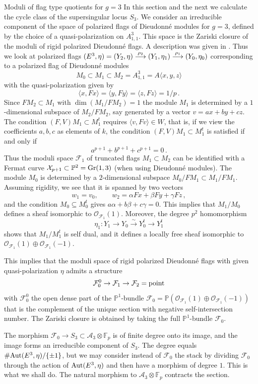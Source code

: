 \documentclass[11pt]{amsart}
\numberwithin{equation}{section}
\newcommand{\FF}{\mathbb F}
\newcommand{\PP}{\mathbb P}
\newcommand\langepijl[1]{\buildrel {#1} \over \longrightarrow}
\theoremstyle{definition}
\theoremstyle{remark}
\begin{document}
\begin{section}{Moduli of flag type quotients for $g=3$}
In this section and the next we calculate the cycle class of the supersingular locus $S_3$.
We consider an irreducible component of 
the space of polarized flags of Dieudonn\'e
modules for $g=3$, defined by the choice of a quasi-polarization on
$A_{1,1}^3$. This space is the Zariski closure 
of the moduli of rigid polarized Dieudonn\'e flags.
A description
was given in \cite[p.\ 58]{L-O}. Thus we look at polarized flags
$(E^3,\eta)=(Y_2,\eta) \langepijl{\rho_2} (Y_1,\eta_1)
\langepijl{\rho_1} (Y_0,\eta_0)$ corresponding to a polarized flag
of Dieudonn\'e modules
$$
M_0 \subset M_1 \subset M_2=A_{1,1}^3=A\langle x,y,z\rangle
$$
with the quasi-polarization given by 
$$
\langle x,Fx\rangle= \langle y,Fy\rangle=\langle z,Fz\rangle=1/p
\, .
$$
Since $FM_2 \subset M_1$ with $\dim(M_1/FM_2)=1$ 
the module $M_1$ is determined by a $1$-dimensional subspace of $M_2/FM_2$,
say generated by a vector $v=ax+by+cz$. The condition 
$(F,V)M_1 \subset M_1^t$ requires $\langle v, Fv\rangle \in W$, that is,
if we view the coefficients
$a,b,c$ as elements of $k$, the condition $(F,V)M_1 \subset M_1^t$ 
is satisfied if and only if 
$$
a^{p+1}+b^{p+1}+c^{p+1}=0 \, .
$$
Thus the moduli space $\mathcal{F}_1$ 
of truncated flags $M_1\subset M_2$ can be identified with a Fermat curve 
$\mathcal{X}_{p+1} \subset  {\PP}^2={\rm Gr}(1,3)$ (when using Dieudonn\'e modules).
The module $M_0$ is
determined by a $2$-dimensional subspace $M_0/FM_1 \subset M_1/FM_1$.
Assuming rigidity,  
we see that it is spanned by two vectors
$$
w_1=v_0, \qquad w_2= \alpha Fx +\beta Fy+\gamma Fz\, ,
$$
and the condition $M_0\subseteq M_0^t$ gives $a\alpha+b\beta+c \gamma=0$.
This implies that $M_1/M_0$ defines a sheaf isomorphic to $\mathcal{O}_{\mathcal{F}_1}(1)$.
Moreover, the degree $p^2$ homomorphism 
$$
\eta_1: Y_1 \to Y_0 \xrightarrow{\sim}  Y_0^t \to Y_1^t 
$$
shows that $M_1/M_1^t$ is self dual, and it defines a locally
free sheaf 
isomorphic to $\mathcal{O}_{\mathcal{F}_1}(1)
\oplus  \mathcal{O}_{\mathcal{F}_1}(-1)$.

This implies that the moduli space of rigid polarized Dieudonn\'e flags
with given quasi-polarization $\eta$ admits a structure
$$
\mathcal{F}_0^0 \to \mathcal{F}_1 \to \mathcal{F}_2=\text{\rm point}
$$
with $\mathcal{F}_0^0$ the open dense part of the ${\PP}^1$-bundle
$\mathcal{F}_0={\PP}(\mathcal{O}_{\mathcal{F}_1}(1)\oplus
\mathcal{O}_{\mathcal{F}_1}(-1))$ 
that is the complement of the
unique section with negative self-intersection number. 
The Zariski closure is obtained by taking the full ${\PP}^1$-bundle
$\mathcal{F}_0$. 

The morphism $\mathcal{F}_0 \to S_3 \subset \mathcal{A}_3\otimes {\FF}_p$ is of 
finite degree onto its image, and the image forms an irreducible component of $S_3$.
The degree equals $\# {\rm Aut}(E^3,\eta)/\{\pm 1\}$, but we may consider instead of
$\mathcal{F}_0$ the stack
by dividing $\mathcal{F}_0$ 
through the action of ${\rm Aut}(E^3,\eta)$ and then have a morphism of degree $1$.
This is what we shall do.
The natural morphism to $\mathcal{A}_3 \otimes {\FF}_p$ contracts the section.
\end{section}
\end{document}
